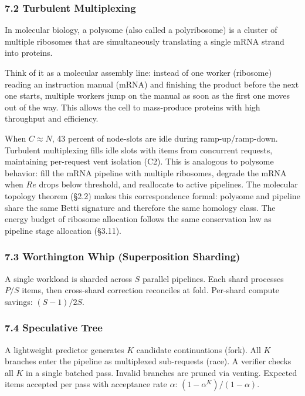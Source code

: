\documentclass[
  11pt,
]{article}
\begin{document}
\subsubsection{7.2 Turbulent Multiplexing}\label{turbulent-multiplexing}

In molecular biology, a polysome (also called a polyribosome) is a
cluster of multiple ribosomes that are simultaneously translating a
single mRNA strand into proteins.

Think of it as a molecular assembly line: instead of one worker
(ribosome) reading an instruction manual (mRNA) and finishing the
product before the next one starts, multiple workers jump on the manual
as soon as the first one moves out of the way. This allows the cell to
mass-produce proteins with high throughput and efficiency.

When \(C \approx N\), 43 percent of node-slots are idle during
ramp-up/ramp-down. Turbulent multiplexing fills idle slots with items
from concurrent requests, maintaining per-request vent isolation (C2).
This is analogous to polysome behavior: fill the mRNA pipeline with
multiple ribosomes, degrade the mRNA when \(Re\) drops below threshold,
and reallocate to active pipelines. The molecular topology theorem
(§2.2) makes this correspondence formal: polysome and pipeline share the
same Betti signature and therefore the same homology class. The energy
budget of ribosome allocation follows the same conservation law as
pipeline stage allocation (§3.11).

\subsubsection{7.3 Worthington Whip (Superposition
Sharding)}\label{worthington-whip-superposition-sharding}

A single workload is sharded across \(S\) parallel pipelines. Each shard
processes \(P/S\) items, then cross-shard correction reconciles at fold.
Per-shard compute savings: \((S-1)/2S\).

\subsubsection{7.4 Speculative Tree}\label{speculative-tree}

A lightweight predictor generates \(K\) candidate continuations (fork).
All \(K\) branches enter the pipeline as multiplexed sub-requests
(race). A verifier checks all \(K\) in a single batched pass. Invalid
branches are pruned via venting. Expected items accepted per pass with
acceptance rate \(\alpha\): \((1 - \alpha^K)/(1 - \alpha)\).
\end{document}
